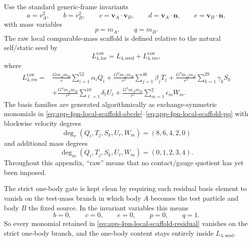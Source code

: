\documentclass[11pt]{article}
\begin{document}
Use the standard generic-frame invariants
\begin{equation}
 a=v_A^2,
 \qquad
 b=v_B^2,
 \qquad
 c=\mathbf v_A\!\cdot\!\mathbf v_B,
 \qquad
 d=\mathbf v_A\!\cdot\!\mathbf n,
 \qquad
 e=\mathbf v_B\!\cdot\!\mathbf n,
 \label{eq:app-4pn-local-scaffold-abcde}
\end{equation}
with mass variables
\begin{equation}
 p=m_A,
 \qquad
 q=m_B.
 \label{eq:app-4pn-local-scaffold-pq}
\end{equation}
The raw local comparable-mass scaffold is defined relative to the natural
self/static seed by
\begin{equation}
L_{4,\mathrm{loc}}^{\mathrm{raw}}
=
L_{4,\mathrm{seed}}
+
L_{4,\mathrm{res}}^{\mathrm{raw}},
\label{eq:app-4pn-local-scaffold-split}
\end{equation}
where
\begin{equation}
\begin{aligned}
L_{4,\mathrm{res}}^{\mathrm{raw}}
={}&
\frac{Gm_A m_B}{r}\sum_{i=1}^{52}\alpha_i Q_i
+\frac{G^2m_A m_B}{r^2}\sum_{j=1}^{46}\beta_j T_j
+\frac{G^3m_A m_B}{r^3}\sum_{k=1}^{29}\gamma_k S_k
\\[0.5ex]
&
+\frac{G^4m_A m_B}{r^4}\sum_{\ell=1}^{10}\delta_{\ell} U_{\ell}
+\frac{G^5m_A m_B}{r^5}\sum_{m=1}^{2}\epsilon_m W_m.
\end{aligned}
\label{eq:app-4pn-local-scaffold-residual}
\end{equation}
The basis families are generated algorithmically as exchange-symmetric monomials
in \eqref{eq:app-4pn-local-scaffold-abcde}--\eqref{eq:app-4pn-local-scaffold-pq}
with blockwise velocity degrees
\begin{equation}
\deg_v(Q_i,T_j,S_k,U_{\ell},W_m)=(8,6,4,2,0)
\label{eq:app-4pn-local-scaffold-velocity-degrees}
\end{equation}
and additional mass degrees
\begin{equation}
\deg_m(Q_i,T_j,S_k,U_{\ell},W_m)=(0,1,2,3,4).
\label{eq:app-4pn-local-scaffold-mass-degrees}
\end{equation}
Throughout this appendix, ``raw'' means that no contact/gauge quotient has yet
been imposed.

The strict one-body gate is kept clean by requiring each residual basis element
to vanish on the test-mass branch in which body $A$ becomes the test particle
and body $B$ the fixed source.  In the invariant variables this means
\begin{equation}
 b=0,
 \qquad
 c=0,
 \qquad
 e=0,
 \qquad
 p=0,
 \qquad
 q=1.
 \label{eq:app-4pn-local-scaffold-testmass-branch}
\end{equation}
So every monomial retained in
\eqref{eq:app-4pn-local-scaffold-residual} vanishes on the strict one-body
branch, and the one-body content stays entirely inside
\(L_{4,\mathrm{seed}}\).
\end{document}
